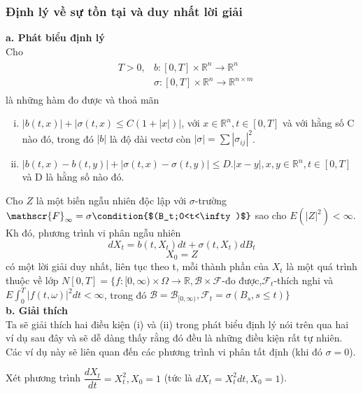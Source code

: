 \documentclass[a4paper]{article}
\numberwithin{equation}{section}
\begin{document}
\subsubsection{Định lý về sự tồn tại và duy nhất lời giải}
\textbf{a. Phát biểu định lý}\\
Cho
\begin{align}
	& \begin{aligned}
	T>0,& b:[0,T]\times\mathbb{R}^n\rightarrow\mathbb{R}^n\\
	& \sigma:[0,T]\times\mathbb{R}^n\rightarrow\mathbb{R}^{n\times m}
\end{aligned}
\end{align}
là những hàm đo được và thoả mãn
\begin{enumerate}[(i)]
	\item $|b(t,x)|+|\sigma(t,x)\leq C(1+|x|)|$, với $x\in\mathbb{R}^n,t\in[0,T]$ và với hằng số C nào đó, trong đó $|b|$ là độ dài vectơ còn $|\sigma|=\sum{|\sigma_{ij}|^2}$.
	\item $|b(t,x)-b(t,y)|+|\sigma(t,x)-\sigma(t,y)|\leq D.|x-y|,x,y\in\mathbb{R}^n,t\in[0,T]$ và D là hằng số nào đó.
\end{enumerate}
Cho $Z$ là một biến ngẫu nhiên độc lập với $\sigma$-trường $\mathscr{F}_\infty=\sigma \condition{$(B_t;0<t<\infty)$}$ sao cho $E(|Z|^2)<\infty$. Kh đó, phương trình vi phân ngẫu nhiên
\begin{equation*}
	dX_t=b(t,X_t)dt+\sigma(t,X_t)dB_t \tag{PT}
\end{equation*}
\begin{equation*}
	X_0=Z
\end{equation*}
có một lời giải duy nhất, liên tục theo t, mỗi thành phần của $X_t$ là một quá trình thuộc về lớp $N[0,T]=\{f:[0,\infty)\times\Omega\rightarrow\mathbb{R},\mathscr{B}\times\mathscr{F}$-đo được,$\mathscr{F}_t$-thích nghi và $E\int_0^T|f(t,\omega)|^2dt<\infty$, trong đó $\mathscr{B}=\mathscr{B}_{[0,\infty)},\mathscr{F}_t=\sigma(B_s,s\leq t)\}$\\
\indent\textbf{b. Giải thích}\\
Ta sẽ giải thích hai điều kiện (i) và (ii) trong phát biểu định lý nói trên qua hai ví dụ sau đây và sẽ dễ dàng thấy rằng đó đều là những điều kiện rất tự nhiên. Các ví dụ này sẽ liên quan đến các phương trình vi phân tất định (khi đó $\sigma=0$).\\
\begin{example}
Xét phương trình $\dfrac{dX_t}{dt}=X^2_t,X_0=1$ (tức là $dX_t=X_t^2dt,X_0=1$).	
\end{example}
\end{document}
